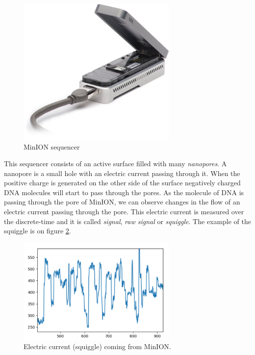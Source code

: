 \begin{figure}
\centerline{\includegraphics[width=0.7\textwidth, height=0.3\textheight]{images/minion}}
\caption[MinION]{MinION sequencer}
\label{obr:minIon}
\end{figure}

This sequencer consists of an active surface filled with many \textit{nanopores}. A nanopore
is a small hole with an electric current passing through it. When the positive charge
is generated on the other side of the surface negatively charged DNA molecules
will start to pass through the pores. As the molecule of DNA is passing through the pore of
MinION, we can observe changes in the flow of an electric current passing through the pore.
This electric current is measured over the discrete-time and it is called \textit{signal},
\textit{raw signal} or \textit{squiggle}. The example of the squiggle is on figure \ref{obr:minIonCurrent}.

\begin{figure}
\centerline{\includegraphics[width=0.7\textwidth, height=0.3\textheight]{images/signal}}
\caption[MinION signal]{Electric current (squiggle) coming from MinION.}
\label{obr:minIonCurrent}
\end{figure}

